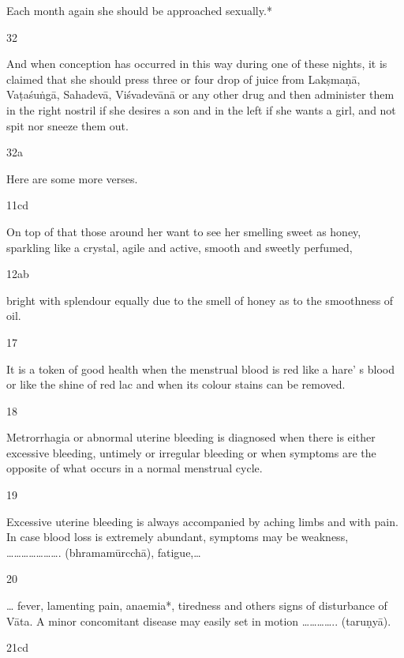 \begin{translation}
\begin{tt}
Each month again she should be approached sexually.* 
  
\item[32]

And when conception has occurred in this way during one of these 
  nights, it is claimed that she should press three or four drop of juice from 
  Lakṣmaṇā, Vaṭaśuṅgā, Sahadevā, Viśvadevānā or any other drug and then 
  administer them in the right nostril if she desires a son and in the left if she 
  wants a girl, and not spit nor sneeze them out. 
  
\item[32a]

Here are some more verses.
  
\item[11cd]

On top of that those around her want to see her smelling sweet as 
  honey, sparkling like a crystal, agile and active, smooth and sweetly perfumed, 
  
\item[12ab]

bright with splendour equally due to the smell of honey as to the 
  smoothness of oil. 
  
\item[17]

It is a token of good health when the menstrual blood is red like a hare’ s 
  blood or like the shine of red lac and when its colour stains can be removed.
  
\item[18]

Metrorrhagia or abnormal uterine bleeding is diagnosed when there is 
  either excessive bleeding, untimely or irregular bleeding or when symptoms are 
  the opposite of what occurs in a normal menstrual cycle. 
  
\item[19]

 Excessive uterine bleeding is always accompanied by aching limbs and 
  with pain. In case blood loss is extremely abundant, symptoms may be 
  weakness, …………………. (bhramamūrcchā), fatigue,…
  
\item[20]

… fever, lamenting pain, anaemia*, tiredness and others signs of 
  disturbance of Vāta. A minor concomitant disease may easily set in motion 
  ………….. (taruṇyā).
  
\item[21cd]


\end{tt}
\end{translation}
